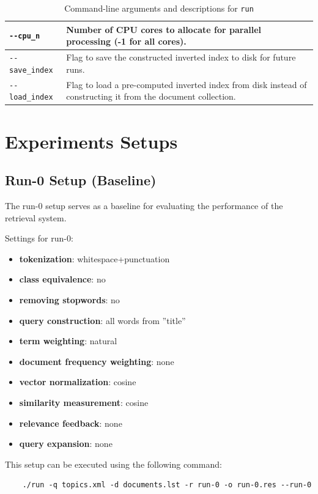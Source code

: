 \documentclass[a4paper, 12pt]{article}
\begin{document}
\begin{table}[htbp]
\begin{tabular}{|l|p{10cm}|}
\texttt{{-}{-}cpu\_n} & Number of CPU cores to allocate for parallel processing (-1 for all cores). \\ \hline
\texttt{{-}{-}save\_index} & Flag to save the constructed inverted index to disk for future runs. \\ \hline
\texttt{{-}{-}load\_index} & Flag to load a pre-computed inverted index from disk instead of constructing it from the document collection. \\
\hline
\end{tabular}
\caption{Command-line arguments and descriptions for \texttt{run}}
\label{tab:main_args}
\end{table}

\newpage

\section{Experiments Setups}

\subsection{Run-0 Setup (Baseline) }

The run-0 setup serves as a baseline for evaluating the performance of the retrieval system.

Settings for run-0:
\begin{itemize}
    \item \textbf{tokenization}: whitespace+punctuation
    \item \textbf{class equivalence}: no
    \item \textbf{removing stopwords}: no
    \item \textbf{query construction}: all words from ”title”
    \item \textbf{term weighting}: natural
    \item \textbf{document frequency weighting}: none
    \item \textbf{vector normalization}: cosine
    \item \textbf{similarity measurement}: cosine
    \item \textbf{relevance feedback}: none
    \item \textbf{query expansion}: none
\end{itemize}

This setup can be executed using the following command:
\begin{verbatim}
    ./run -q topics.xml -d documents.lst -r run-0 -o run-0.res --run-0
\end{verbatim}
\end{document}
